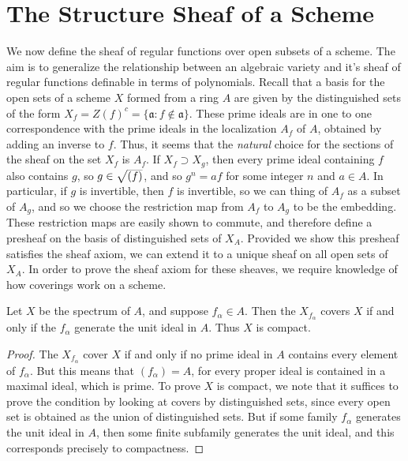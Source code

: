 \section{The Structure Sheaf of a Scheme}

We now define the sheaf of regular functions over open subsets of a scheme. The aim is to generalize the relationship between an algebraic variety and it's sheaf of regular functions definable in terms of polynomials. Recall that a basis for the open sets of a scheme $X$ formed from a ring $A$ are given by the distinguished sets of the form $X_f = Z(f)^c = \{ \mathfrak{a}: f \not \in \mathfrak{a} \}$. These prime ideals are in one to one correspondence with the prime ideals in the localization $A_f$ of $A$, obtained by adding an inverse to $f$. Thus, it seems that the {\it natural} choice for the sections of the sheaf on the set $X_f$ is $A_f$. If $X_f \supset X_g$, then every prime ideal containing $f$ also contains $g$, so $g \in \smash{\sqrt{(f)}}$, and so $g^n = af$ for some integer $n$ and $a \in A$. In particular, if $g$ is invertible, then $f$ is invertible, so we can thing of $A_f$ as a subset of $A_g$, and so we choose the restriction map from $A_f$ to $A_g$ to be the embedding. These restriction maps are easily shown to commute, and therefore define a presheaf on the basis of distinguished sets of $X_A$. Provided we show this presheaf satisfies the sheaf axiom, we can extend it to a unique sheaf on all open sets of $X_A$. In order to prove the sheaf axiom for these sheaves, we require knowledge of how coverings work on a scheme.

\begin{lemma}
    Let $X$ be the spectrum of $A$, and suppose $f_\alpha \in A$. Then the $X_{f_\alpha}$ covers $X$ if and only if the $f_\alpha$ generate the unit ideal in $A$. Thus $X$ is compact.
\end{lemma}
\begin{proof}
    The $X_{f_\alpha}$ cover $X$ if and only if no prime ideal in $A$ contains every element of $f_\alpha$. But this means that $(f_\alpha) = A$, for every proper ideal is contained in a maximal ideal, which is prime. To prove $X$ is compact, we note that it suffices to prove the condition by looking at covers by distinguished sets, since every open set is obtained as the union of distinguished sets. But if some family $f_\alpha$ generates the unit ideal in $A$, then some finite subfamily generates the unit ideal, and this corresponds precisely to compactness.
\end{proof}

